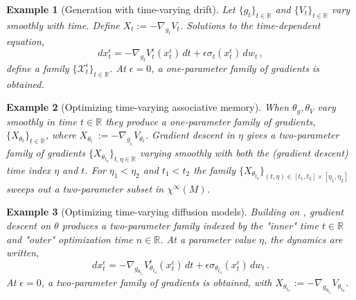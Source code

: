 \documentclass[12pt]{article}
\newtheorem{example}{Example}
\begin{document}
\begin{example}[Generation with time-varying drift]
\label{example:one-parameter-family-generation}
    Let $\{g_t \}_{t\in\mathbb{R}}$ and $\{V_t \}_{t\in\mathbb{R}}$ vary smoothly with time. Define $X_t:=-\nabla_{g_t}V_t$. Solutions to the time-dependent equation,
    \begin{equation*}
        d{x_t^{\epsilon}} = -\nabla_{g_t}V^{\epsilon}_t(x_t^{\epsilon})\,dt + \epsilon\sigma_t(x_t^{\epsilon})\,dw_t \, ,
    \end{equation*}
     define a family $\{ \mathcal{X}^{\epsilon}_{t}\}_{t\in\mathbb{R}}$. At $\epsilon=0$, a one-parameter family of gradients is obtained.
\end{example}  

\begin{example}[Optimizing time-varying associative memory]
\label{example:two-parameter-family-associative-memory-optimization}
    When $\theta_g, \theta_V$ vary smoothly in time $t\in \mathbb{R}$ they produce a one-parameter family of gradients, $\{X_{\theta_t}\}_{t\in \mathbb{R}}$, where $X_{\theta_t}\ := -\nabla_{g_{_{\theta_t}}} V_{\theta_t}$. Gradient descent in $\eta$ gives a two-parameter family of gradients $\{ X_{\theta_{t_{\eta}}} \}_{t,\eta\in \mathbb{R}}$ varying smoothly with both the (gradient descent) time index $\eta$ and $t$. For $\eta_1 < \eta_2$ and $t_1 < t_2$ the family $\{ X_{\theta_{t_{\eta}}} \}_{(t,\eta) \in [t_1,t_2] \times [\eta_1,\eta_2]}$ sweeps out a two-parameter subset in $\chi^{\infty}(M)$.
\end{example}  

\begin{example}[Optimizing time-varying diffusion models]
\label{example:two-parameter-family-explicit}
    Building on , gradient descent on $\theta$ produces a two-parameter family indexed by the "inner" time $t\in \mathbb{R}$ and "outer" optimization time $n\in\mathbb{R}$. At a parameter value $\eta$, the dynamics are written,
    \begin{equation*}
        d{x_t^{\epsilon}} = -\nabla_{g_{\theta_{t_{\eta}}}}V^{\epsilon}_{\theta_{t_{\eta}}}(x_t^{\epsilon})\,dt + \epsilon\sigma_{\theta_{t_{\eta}}}(x_t^{\epsilon})\,dw_t \, .
    \end{equation*}        
     At $\epsilon = 0$, a two-parameter family of gradients is obtained, with $X_{\theta_{t_{{n}}}} := -\nabla_{g_{\theta_{t_{\eta}}}}V_{\theta_{t_{\eta}}}$. 
\end{example}  
\end{document}
